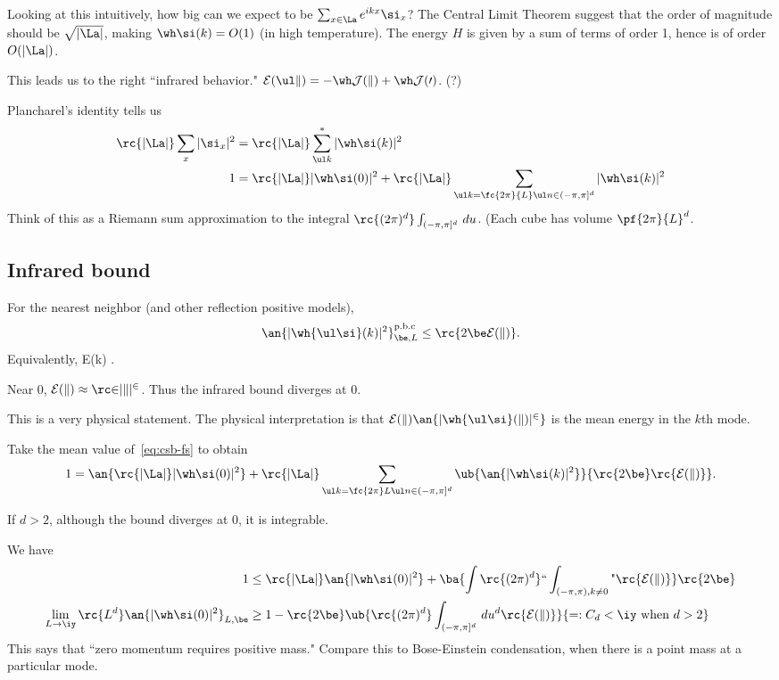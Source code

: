 Looking at this intuitively, %
how big can we expect to be $\sum_{x\in \La} e^{ikx}\si_x$? The Central Limit Theorem suggest that the order of magnitude should be $\sqrt{|\La|}$, making $\wh \si(k)=O(1)$ (in high temperature). The energy $H$ is given by a sum of terms of order 1, hence is of order $O(|\La|)$. 

This leads us to the right ``infrared behavior." $\cal E(\ul k) = -\wh J(k) + \wh J(0)$. (?)

Plancharel's identity tells us
\begin{align}
\rc{|\La|}\sum_x |\si_x|^2 &= 
\rc{|\La|}\sum_{\ul k}^* |\wh \si(k)|^2\\
1 &= \rc{|\La|}|\wh \si(0)|^2 + \rc{|\La|} \sum_{\ul k = \fc{2\pi}{L} \ul n\in (-\pi, \pi]^d}|\wh \si(k)|^2
\end{align}
Think of this as a Riemann sum approximation to the integral $\rc{(2\pi)^d}\int_{(-\pi,\pi]^d}\,du$. (Each cube has volume $\pf{2\pi}{L}^d$.

\subsection{Infrared bound}
\begin{thm}
For the nearest neighbor (and other reflection positive models), \[\an{|\wh{\ul\si}(k)|^2}_{\be, L}^{\text{p.b.c}}\le \rc{2\be \cal E(k)}.\]
Equivalently,
\cal E(k)  \le \rc{2\be}.
\eeq
\end{thm}
Near 0, $\cal E(k) \approx \rc 2| k|^2$. Thus the infrared bound diverges at 0.

This is a very physical statement. %
The physical interpretation is that $\cal E(k) \an{|\wh{\ul\si}(k)|^2}$ is the mean energy in the $k$th mode. %

Take the mean value of~\eqref{eq:csb-fs} to obtain
\[
1 = \an{\rc{|\La|} |\wh \si(0)|^2} + \rc{|\La|} \sum_{\ul k=\fc{2\pi}L \ul n\in (-\pi, \pi]^d} \ub{\an{|\wh \si(k)|^2}}{\rc{2\be} \rc{\cal E(k)}}.
\]

If $d>2$, although the bound diverges at 0, it is integrable. 

We have
\begin{align}
1&\le \rc{|\La|} \an{|\wh \si(0)|^2} +\ba{ \int \rc{(2\pi)^d} \text{``} \int_{(-\pi,\pi), k\ne 0} \text{"}\rc{\cal E(k)} }\rc{2\be}\\
\lim_{L\to \iy} \rc{L^d} \an{|\wh \si(0)|^2}_{L,\be} 
&\ge 1-\rc{2\be} \ub{\rc{(2\pi)^d} \int_{(-\pi, \pi]^d} \,du^d \rc{\cal E(k)}}{=:C_d<\iy \text{ when }d>2}
\end{align}
This says that ``zero momentum requires positive mass." Compare this to Bose-Einstein condensation, when there is a point mass at a particular mode.

